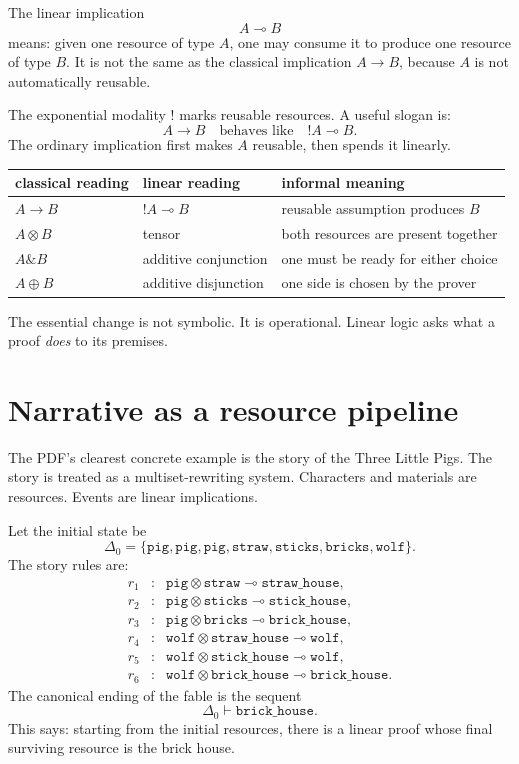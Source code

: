 \begin{definition}
The linear implication
\[
  A\multimap B
\]
means: given one resource of type \(A\), one may consume it to produce one resource of type \(B\).  It is not the same as the classical implication \(A\to B\), because \(A\) is not automatically reusable.
\end{definition}

The exponential modality \(!\) marks reusable resources.  A useful slogan is:
\[
  A\to B
  \quad \text{behaves like} \quad
  {!A}\multimap B.
\]
The ordinary implication first makes \(A\) reusable, then spends it linearly.

\begin{center}
\begin{tabular}{lll}
\toprule
classical reading & linear reading & informal meaning\\
\midrule
\(A\to B\) & \(!A\multimap B\) & reusable assumption produces \(B\)\\
\(A\otimes B\) & tensor & both resources are present together\\
\(A\& B\) & additive conjunction & one must be ready for either choice\\
\(A\oplus B\) & additive disjunction & one side is chosen by the prover\\
\bottomrule
\end{tabular}
\end{center}

The essential change is not symbolic.  It is operational.  Linear logic asks what a proof \emph{does} to its premises.

\section{Narrative as a resource pipeline}

The PDF's clearest concrete example is the story of the Three Little Pigs.  The story is treated as a multiset-rewriting system.  Characters and materials are resources.  Events are linear implications.

Let the initial state be
\[
  \Delta_0=\{\texttt{pig},\texttt{pig},\texttt{pig},
  \texttt{straw},\texttt{sticks},\texttt{bricks},\texttt{wolf}\}.
\]
The story rules are:
\[
\begin{array}{rcl}
r_1&:&\texttt{pig}\otimes\texttt{straw}\multimap\texttt{straw\_house},\\
r_2&:&\texttt{pig}\otimes\texttt{sticks}\multimap\texttt{stick\_house},\\
r_3&:&\texttt{pig}\otimes\texttt{bricks}\multimap\texttt{brick\_house},\\
r_4&:&\texttt{wolf}\otimes\texttt{straw\_house}\multimap\texttt{wolf},\\
r_5&:&\texttt{wolf}\otimes\texttt{stick\_house}\multimap\texttt{wolf},\\
r_6&:&\texttt{wolf}\otimes\texttt{brick\_house}\multimap\texttt{brick\_house}.
\end{array}
\]
The canonical ending of the fable is the sequent
\[
  \Delta_0\vdash \texttt{brick\_house}.
\]
This says: starting from the initial resources, there is a linear proof whose final surviving resource is the brick house.

